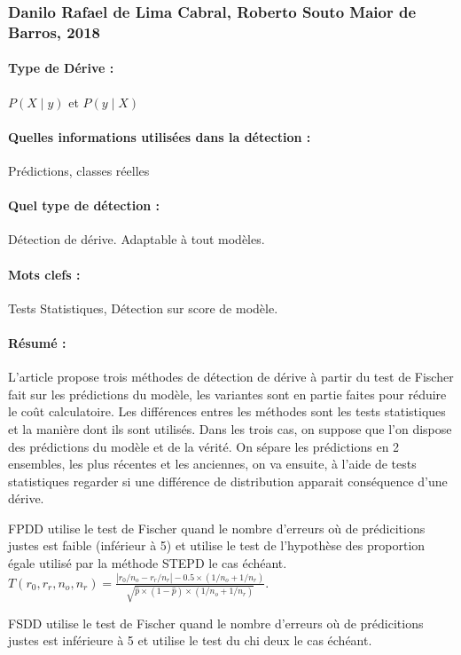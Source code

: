 \documentclass[11pt,a4paper]{report}
\begin{document}
\subsubsection{Danilo Rafael de Lima Cabral, Roberto Souto Maior de Barros, 2018}

\paragraph{Type de Dérive :} $P(X\mid y)$ et $P(y \mid X)$
\paragraph{Quelles informations utilisées dans la détection :} Prédictions, classes réelles
\paragraph{Quel type de détection :} Détection de dérive. Adaptable à tout modèles.

\paragraph{Mots clefs :} Tests Statistiques, Détection sur score de modèle.

\paragraph{Résumé :}
L'article propose trois méthodes de détection de dérive à partir du test de Fischer fait sur les prédictions du modèle, les variantes sont en partie faites pour réduire le coût calculatoire. Les différences entres les méthodes sont les tests statistiques et la manière dont ils sont utilisés. Dans les trois cas, on suppose que l'on dispose des prédictions du modèle et de la vérité. On sépare les prédictions en 2 ensembles, les plus récentes et les anciennes, on va ensuite, à l'aide de tests statistiques regarder si une différence de distribution apparait conséquence d'une dérive. 

FPDD utilise le test de Fischer quand le nombre d'erreurs où de prédicitions justes est faible (inférieur à 5) et utilise le test de l'hypothèse des proportion égale utilisé par la méthode STEPD le cas échéant. $T\left(r_{0}, r_{r}, n_{o}, n_{r}\right)=\frac{\left|r_{0} / n_{o}-r_{r} / n_{r}\right|-0.5 \times\left(1 / n_{o}+1 / n_{r}\right)}{\sqrt{\hat{p} \times(1-\hat{p}) \times\left(1 / n_{o}+1 / n_{r}\right)}}$.

FSDD utilise le test de Fischer quand le nombre d'erreurs où de prédicitions justes est inférieure à 5 et utilise le test du chi deux le cas échéant.
\end{document}

